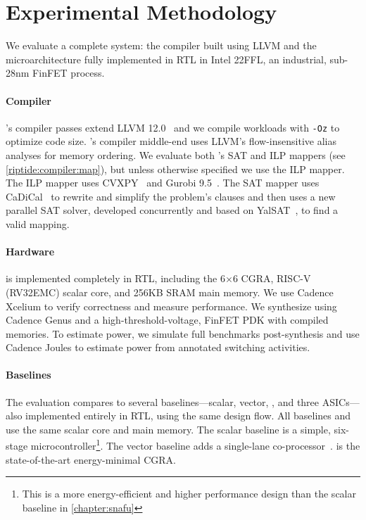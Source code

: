 \section{Experimental Methodology}
\label{riptide:method}

We evaluate a complete \riptide system: the compiler built using LLVM and the
microarchitecture fully implemented in RTL in Intel 22FFL,
an industrial, sub-28nm FinFET process.

\paragraph{Compiler}
\riptide's compiler passes extend LLVM 12.0~\cite{llvm} and we compile workloads with
\texttt{-Oz} to optimize code size.  
% 
\riptide's compiler middle-end uses LLVM's
flow-insensitive alias analyses for memory ordering.
%
We evaluate both \riptide's SAT and ILP mappers (see \autoref{riptide:compiler:map}), but unless otherwise specified we use the ILP mapper.
% 
The ILP mapper uses CVXPY~\cite{cvxpy} and Gurobi 9.5~\cite{gurobi}.
%
The SAT mapper uses CaDiCal~\cite{cadical} to rewrite and simplify the problem's clauses and then uses a new parallel SAT solver, developed concurrently and based on YalSAT~\cite{yalsat}, to find a valid mapping.

\paragraph{Hardware}
\label{method:hardware}
\riptide is implemented completely in RTL, including the 6$\times$6 CGRA, RISC-V
(RV32EMC) scalar core, and 256KB
SRAM main memory. 
% 
We use Cadence Xcelium to verify correctness and measure
performance.
% 
We synthesize \riptide using Cadence Genus and a
high-threshold-voltage, FinFET PDK with compiled memories.
% 
To estimate power, we simulate full benchmarks post-synthesis and use Cadence
Joules to estimate power from annotated switching activities.

\paragraph{Baselines}
The evaluation compares to several baselines---scalar, vector, \snafu, and
three ASICs---also implemented entirely in RTL, using the same design
flow.
% 
All baselines and \riptide use the same scalar core and main memory.
% 
The scalar baseline is a simple, six-stage microcontroller\footnote{This is a more energy-efficient and higher performance design than the scalar baseline in \autoref{chapter:snafu}}.
% 
The vector baseline adds a single-lane co-processor~\cite{manic}.
% 
\snafu is the state-of-the-art energy-minimal CGRA.

